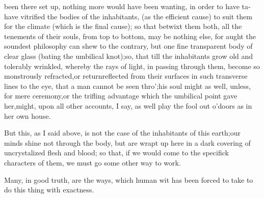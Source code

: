 \documentclass{article}
\begin{document}
\noindent
{}
been there set up,
nothing more would have been wanting, in order to have ta- 
\sic\break
{}
have vitrified the
bodies of the inhabitants, (as the efficient cause) to suit them
for the climate (which is the final cause); so that betwixt them
both, all the tenements of their souls, from top to bottom, may
be nothing else, for aught the soundest philosophy can shew to
the contrary, but one fine transparent body of clear glass
(bating the umbilical knot);\tsk\break so, that till the inhabitants
grow old and tolerably wrinkled, whereby the rays of light, in
passing through them, become so monstrously refracted,\tsh or
return\break reflected from their surfaces in such\break
transverse lines to
the eye, that a man cannot be seen thro’;\tsk his soul might
as well, unless, for mere ceremony,\tsk or the trifling advantage
which the umbilical point gave her,\tsk might, upon all other
accounts, I say, as well play the fool out o’doors as in her own
house.

But this, as I said above, is not the case of the inhabitants of
this earth;\tsk our minds shine not through the body, but are wrapt
up here in a dark covering of uncrystalized flesh and blood; so
that, if we would come to the specifick characters of them, we must
go some other way to work.

Many, in good truth, are the ways, which human wit has been
forced to take to do this thing with exactness.
\end{document}
